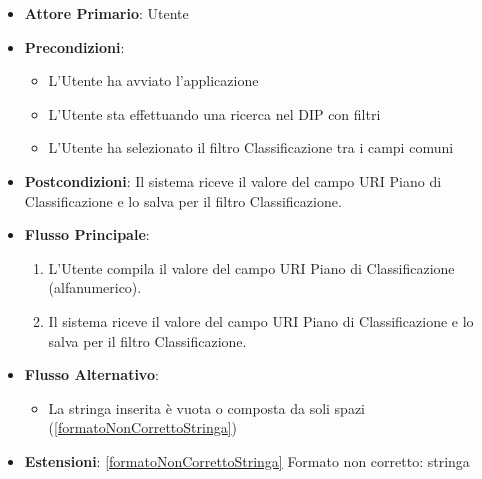 \label{compilaValoreFiltroURIPianoDiClassificazione}
\begin{itemize}
      \item \textbf{Attore Primario}: Utente
      \item \textbf{Precondizioni}:
      \begin{itemize}
            \item L'Utente ha avviato l'applicazione
            \item L'Utente sta effettuando una ricerca nel DIP con filtri
            \item L'Utente ha selezionato il filtro Classificazione tra i campi comuni
      \end{itemize}
      \item \textbf{Postcondizioni}: Il sistema riceve il valore del campo URI Piano di Classificazione e lo salva per il filtro Classificazione.
      \item \textbf{Flusso Principale}:
      \begin{enumerate}
            \item L'Utente compila il valore del campo URI Piano di Classificazione (alfanumerico).
            \item Il sistema riceve il valore del campo URI Piano di Classificazione e lo salva per il filtro Classificazione.
      \end{enumerate}
      \item \textbf{Flusso Alternativo}:
      \begin{itemize}
            \item La stringa inserita è vuota o composta da soli spazi (\ref{formatoNonCorrettoStringa})
      \end{itemize}
      \item \textbf{Estensioni}: \ref{formatoNonCorrettoStringa} Formato non corretto: stringa
\end{itemize}

